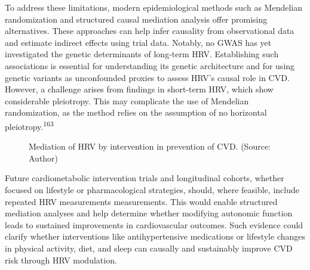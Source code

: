 \documentclass[
  letterpaper,
  headsepline=true,
  open=any]{scrbook}
\begin{document}
To address these limitations, modern epidemiological methods such as
Mendelian randomization and structured causal mediation analysis offer
promising alternatives. These approaches can help infer causality from
observational data and estimate indirect effects using trial data.
Notably, no GWAS has yet investigated the genetic determinants of
long-term HRV. Establishing such associations is essential for
understanding its genetic architecture and for using genetic variants as
unconfounded proxies to assess HRV's causal role in CVD. However, a
challenge arises from findings in short-term HRV, which show
considerable pleiotropy. This may complicate the use of Mendelian
randomization, as the method relies on the assumption of no horizontal
pleiotropy.\textsuperscript{163}

\begin{figure}

\begin{minipage}[t]{\linewidth}

{\centering 


\caption{Mediation of HRV by intervention in prevention of CVD. (Source:
Author)}

}

\end{minipage}%

\end{figure}

Future cardiometabolic intervention trials and longitudinal cohorts,
whether focused on lifestyle or pharmacological strategies, should,
where feasible, include repeated HRV measurements measurements. This
would enable structured mediation analyses and help determine whether
modifying autonomic function leads to sustained improvements in
cardiovascular outcomes. Such evidence could clarify whether
interventions like antihypertensive medications or lifestyle changes in
physical activity, diet, and sleep can causally and sustainably improve
CVD risk through HRV modulation.
\end{document}

